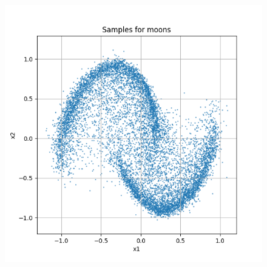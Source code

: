 \documentclass[a4paper,12pt]{article}
\begin{document}
\begin{figure}[H]
\begin{minipage}{0.3\textwidth}
  \end{minipage}
  \begin{minipage}{0.3\textwidth}
      \centering
      \includegraphics[width=\linewidth]{"images/Samples for ddpm_2_200_0.0001_0.05_moons_linear.png"}
  \end{minipage}

  \vspace{0.5cm}


\end{figure}
\end{document}
